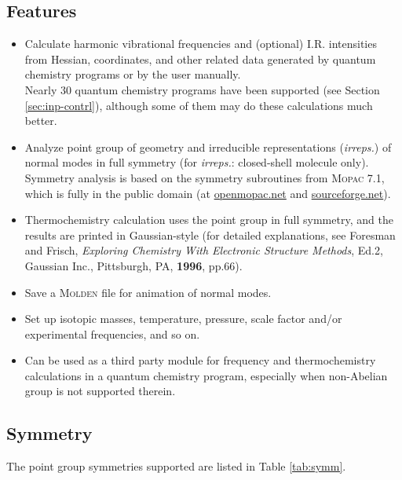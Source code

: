 \documentclass[12pt,english]{extarticle}
\begin{document}
\subsection{Features} \label{sec:feature}

\begin{itemize}
\item Calculate harmonic vibrational frequencies and (optional) I.R. intensities from Hessian, coordinates, and other related data generated by quantum chemistry programs or by the user manually. \\
    Nearly 30 quantum chemistry programs have been supported (see Section \ref{sec:inp-contrl}), although some of them may do these calculations much better.
\item Analyze point group of geometry and irreducible representations (\emph{irreps.}) of normal modes in full symmetry (for \emph{irreps.}: closed-shell molecule only). \\
    Symmetry analysis is based on the symmetry subroutines from \textsc{Mopac} 7.1, which is fully in the public domain (at \href{http://openmopac.net/Downloads/Downloads.html}{openmopac.net} and \href{https://sourceforge.net/projects/mopac7/}{sourceforge.net}).
\item Thermochemistry calculation uses the point group in full symmetry, and the results are printed in Gaussian-style (for detailed explanations, see Foresman and Frisch, \emph{Exploring Chemistry With Electronic Structure Methods}, Ed.2, Gaussian Inc., Pittsburgh, PA, \textbf{1996}, pp.66).
\item Save a \textsc{Molden} file for animation of normal modes.
\item Set up isotopic masses, temperature, pressure, scale factor and/or experimental frequencies, and so on.
\item Can be used as a third party module for frequency and thermochemistry calculations in a quantum chemistry program, especially when non-Abelian group is not supported therein.
\end{itemize}

\subsection{Symmetry} \label{sec:symm}

The point group symmetries supported are listed in Table \ref{tab:symm}.
\end{document}
